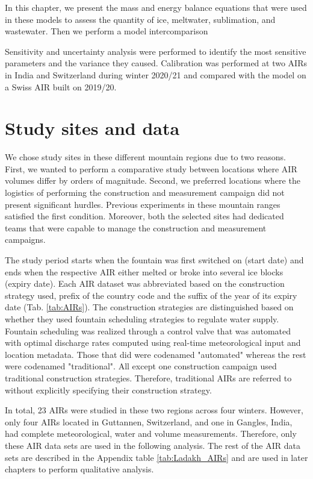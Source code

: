 In this chapter, we present the mass and energy balance equations that were used in these models to assess the
quantity of ice, meltwater, sublimation, and wastewater. Then we perform a model intercomparison 

Sensitivity and uncertainty analysis were performed to identify the most sensitive parameters and the variance
they caused. Calibration was performed at two \ac{AIRs} in India and Switzerland during winter 2020/21 and
compared with the model on a Swiss AIR built on 2019/20.

\section{Study sites and data}

We chose study sites in these different mountain regions due to two reasons. First, we wanted to perform a
comparative study between locations where AIR volumes differ by orders of magnitude. Second, we preferred
locations where the logistics of performing the construction and measurement campaign did not present
significant hurdles. Previous experiments in these mountain ranges satisfied the first condition. Moreover, both
the selected sites had dedicated teams that were capable to manage the construction and measurement campaigns.

The study period starts when the fountain was first switched on (start date) and ends when the respective AIR
either melted or broke into several ice blocks (expiry date).  Each AIR dataset was abbreviated based on the
construction strategy used, prefix of the country code and the suffix of the year of its expiry date
(Tab. \ref{tab:AIRs}). The construction strategies are distinguished based on whether they used fountain scheduling
strategies to regulate water supply. Fountain scheduling was realized through a control valve that was automated
with optimal discharge rates computed using real-time meteorological input and location metadata. Those that did were
codenamed "automated" whereas the rest were codenamed "traditional". All except one construction campaign used
traditional construction strategies. Therefore, traditional \ac{AIRs} are referred to without explicitly
specifying their construction strategy.

In total, 23 \ac{AIRs} were studied in these two regions across four winters.  However, only four \ac{AIRs} located in
Guttannen, Switzerland, and one in Gangles, India, had complete meteorological, water and volume measurements. Therefore,
only these AIR data sets are used in the following analysis. The rest of the AIR data sets are described in the
Appendix table \ref{tab:Ladakh_AIRs} and are used in later chapters to perform qualitative analysis.

